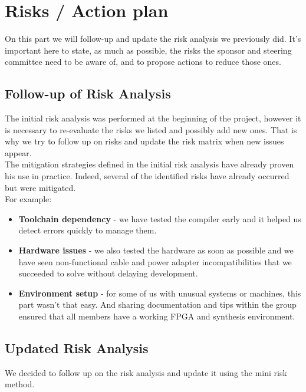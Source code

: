 \documentclass[10pt]{article}
\begin{document}
\newpage
\section{Risks / Action plan}

On this part we will follow-up and update the risk analysis we previously did. It’s important here to state, as much as possible, the risks the sponsor and steering committee need to be aware of, and to propose actions to reduce those ones.

\subsection{Follow-up of Risk Analysis}

The initial risk analysis was performed at the beginning of the project, however it is necessary to re-evaluate the risks we listed and possibly add new ones. That is why we try to follow up on risks and update the risk matrix when new issues appear.\\
The mitigation strategies defined in the initial risk analysis have already proven his use in practice. Indeed, several of the identified risks have already occurred but were mitigated.\\ 
For example:
\begin{itemize}
    \item \textbf{Toolchain dependency} - we have tested the compiler early and it helped us detect errors quickly to manage them.
    \item \textbf{Hardware issues} - we also tested the hardware as soon as possible and we have seen non-functional cable and power adapter incompatibilities that we succeeded to solve without delaying development.
    \item \textbf{Environment setup} - for some of us with unusual systems or machines, this part wasn’t that easy. And sharing documentation and tips within the group ensured that all members have a working FPGA and synthesis environment.
\end{itemize}

\subsection{Updated Risk Analysis}

We decided to follow up on the risk analysis and update it using the mini risk method.\\
\end{document}
